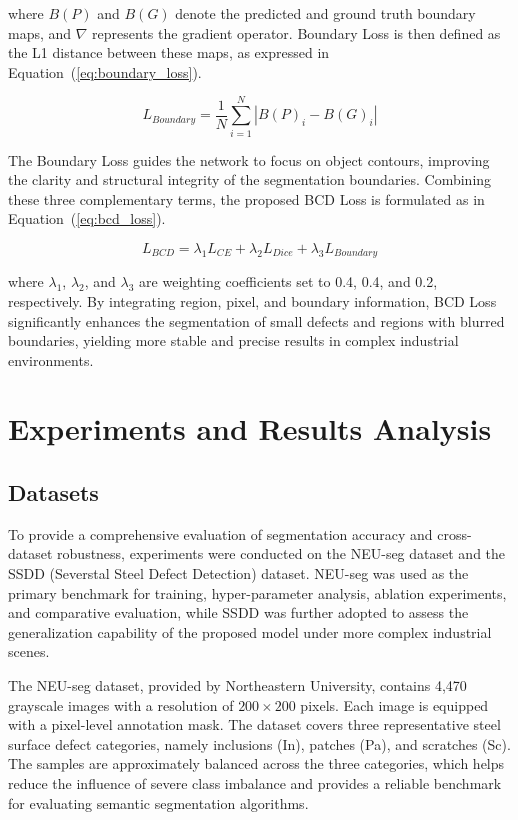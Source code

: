 \documentclass[sn-basic]{sn-jnl}
\theoremstyle{thmstyleone}%
\theoremstyle{thmstyletwo}%
\theoremstyle{thmstylethree}%
\begin{document}
where $B(P)$ and $B(G)$ denote the predicted and ground truth boundary maps, and $\nabla$ represents the gradient operator. Boundary Loss\cite{Kervadec2019Boundary} is then defined as the L1 distance between these maps, as expressed in Equation~(\ref{eq:boundary_loss}).

\begin{equation}
L_{Boundary} = \frac{1}{N} \sum_{i=1}^{N} | B(P)_i - B(G)_i |
\label{eq:boundary_loss}
\end{equation}

The Boundary Loss guides the network to focus on object contours, improving the clarity and structural integrity of the segmentation boundaries. Combining these three complementary terms, the proposed BCD Loss is formulated as in Equation~(\ref{eq:bcd_loss}).

\begin{equation}
L_{BCD} = \lambda_1 L_{CE} + \lambda_2 L_{Dice} + \lambda_3 L_{Boundary}
\label{eq:bcd_loss}
\end{equation}

where $\lambda_1$, $\lambda_2$, and $\lambda_3$ are weighting coefficients set to 0.4, 0.4, and 0.2, respectively. By integrating region, pixel, and boundary information, BCD Loss significantly enhances the segmentation of small defects and regions with blurred boundaries, yielding more stable and precise results in complex industrial environments.



\section{Experiments and Results Analysis}

\subsection{Datasets}
To provide a comprehensive evaluation of segmentation accuracy and cross-dataset robustness, experiments were conducted on the NEU-seg dataset and the SSDD (Severstal Steel Defect Detection) dataset. NEU-seg was used as the primary benchmark for training, hyper-parameter analysis, ablation experiments, and comparative evaluation, while SSDD was further adopted to assess the generalization capability of the proposed model under more complex industrial scenes.

The NEU-seg dataset, provided by Northeastern University, contains 4,470 grayscale images with a resolution of $200\times200$ pixels. Each image is equipped with a pixel-level annotation mask. The dataset covers three representative steel surface defect categories, namely inclusions (In), patches (Pa), and scratches (Sc). The samples are approximately balanced across the three categories, which helps reduce the influence of severe class imbalance and provides a reliable benchmark for evaluating semantic segmentation algorithms.
\end{document}
